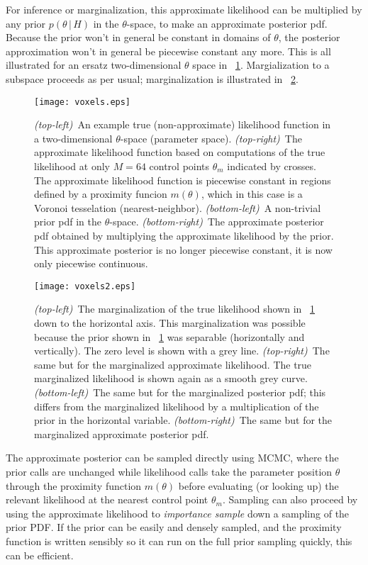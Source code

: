 \documentclass[12pt]{article}
\newcommand{\given}{\,|\,}
\begin{document}
For inference or marginalization, this approximate likelihood can be
multiplied by any prior $p(\theta\given H)$ in the $\theta$-space, to
make an approximate posterior pdf.  Because the prior won't in general
be constant in domains of $\theta$, the posterior approximation won't
in general be piecewise constant any more.  This is all illustrated
for an ersatz two-dimensional $\theta$ space in
\figurename~\ref{fig:posterior}.  Margialization to a subspace
proceeds as per usual; marginalization is illustrated in
\figurename~\ref{fig:marginal}.

\begin{figure}[p]
\texttt{[image: voxels.eps]}
\caption{\textsl{(top-left)}~An example true (non-approximate)
  likelihood function in a two-dimensional $\theta$-space (parameter
  space). \textsl{(top-right)}~The approximate likelihood function
  based on computations of the true likelihood at only $M=64$ control
  points $\theta_m$ indicated by crosses.  The approximate likelihood
  function is piecewise constant in regions defined by a proximity
  funcion $m(\theta)$, which in this case is a Voronoi tesselation
  (nearest-neighbor).  \textsl{(bottom-left)}~A non-trivial prior pdf
  in the $\theta$-space.  \textsl{(bottom-right)}~The approximate
  posterior pdf obtained by multiplying the approximate likelihood by
  the prior.  This approximate posterior is no longer piecewise
  constant, it is now only piecewise continuous.\label{fig:posterior}}
\end{figure}

\begin{figure}[p]
\texttt{[image: voxels2.eps]}
\caption{\textsl{(top-left)}~The marginalization of the true
  likelihood shown in \figurename~\ref{fig:posterior} down to the
  horizontal axis.  This marginalization was possible because the
  prior shown in \figurename~\ref{fig:posterior} was separable
  (horizontally and vertically).  The zero level is shown with a grey
  line.  \textsl{(top-right)}~The same but for the marginalized
  approximate likelihood.  The true marginalized likelihood is shown
  again as a smooth grey curve.  \textsl{(bottom-left)}~The same but
  for the marginalized posterior pdf; this differs from the
  marginalized likelihood by a multiplication of the prior in the
  horizontal variable.  \textsl{(bottom-right)}~The same but for the
  marginalized approximate posterior pdf.\label{fig:marginal}}
\end{figure}

The approximate posterior can be sampled directly using MCMC, where
the prior calls are unchanged while likelihood calls take the
parameter position $\theta$ through the proximity function $m(\theta)$
before evaluating (or looking up) the relevant likelihood at the
nearest control point $\theta_m$.  Sampling can also proceed by using
the approximate likelihood to \emph{importance sample} down a sampling
of the prior PDF.  If the prior can be easily and densely sampled, and
the proximity function is written sensibly so it can run on the full
prior sampling quickly, this can be efficient.
\end{document}
